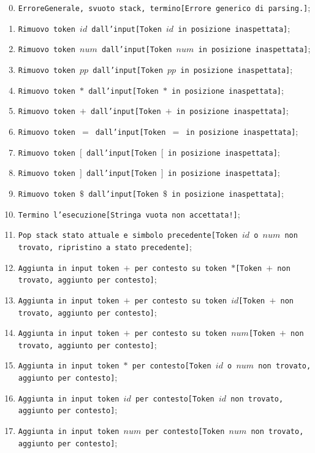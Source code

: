\documentclass[a4paper,italian]{article}
\begin{document}
\begin{enumerate}\setcounter{enumi}{-1}
	\item \texttt{ErroreGenerale, svuoto stack, termino[Errore generico di parsing.]};
	\item \texttt{Rimuovo token $id$ dall'input[Token $id$ in posizione inaspettata]};
	\item \texttt{Rimuovo token $num$ dall'input[Token $num$ in posizione inaspettata]};
	\item \texttt{Rimuovo token $pp$ dall'input[Token $pp$ in posizione inaspettata]};
	\item \texttt{Rimuovo token $*$ dall'input[Token $*$ in posizione inaspettata]};
	\item \texttt{Rimuovo token $+$ dall'input[Token $+$ in posizione inaspettata]};
	\item \texttt{Rimuovo token $=$ dall'input[Token $=$ in posizione inaspettata]};
	\item \texttt{Rimuovo token $[$ dall'input[Token $[$ in posizione inaspettata]};
	\item \texttt{Rimuovo token $]$ dall'input[Token $]$ in posizione inaspettata]};
	\item \texttt{Rimuovo token $\$$ dall'input[Token $\$$ in posizione inaspettata]};
	\item \texttt{Termino l'esecuzione[Stringa vuota non accettata!]};
	\item \texttt{Pop stack stato attuale e simbolo precedente[Token $id$ o $num$ non trovato, ripristino a stato precedente]};
	\item \texttt{Aggiunta in input token $+$ per contesto su token $*$[Token $+$ non trovato, aggiunto per contesto]};
	\item \texttt{Aggiunta in input token $+$ per contesto su token $id$[Token $+$ non trovato, aggiunto per contesto]};
	\item \texttt{Aggiunta in input token $+$ per contesto su token $num$[Token $+$ non trovato, aggiunto per contesto]};
	\item \texttt{Aggiunta in input token $*$ per contesto[Token $id$ o $num$ non trovato, aggiunto per contesto]};
	\item \texttt{Aggiunta in input token $id$ per contesto[Token $id$ non trovato, aggiunto per contesto]};
	\item \texttt{Aggiunta in input token $num$ per contesto[Token $num$ non trovato, aggiunto per contesto]};
\end{enumerate}
\end{document}
